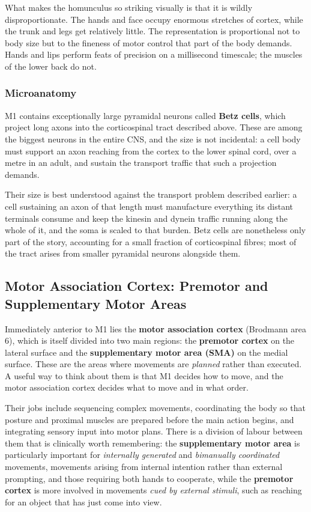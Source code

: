 \documentclass[11pt]{article}
\begin{document}
What makes the homunculus so striking visually is that it is wildly disproportionate. The hands and face occupy enormous stretches of cortex, while the trunk and legs get relatively little. The representation is proportional not to body size but to the fineness of motor control that part of the body demands. Hands and lips perform feats of precision on a millisecond timescale; the muscles of the lower back do not.

\subsubsection{Microanatomy}

M1 contains exceptionally large pyramidal neurons called \textbf{Betz cells}, which project long axons into the corticospinal tract described above. These are among the biggest neurons in the entire CNS, and the size is not incidental: a cell body must support an axon reaching from the cortex to the lower spinal cord, over a metre in an adult, and sustain the transport traffic that such a projection demands.

Their size is best understood against the transport problem described earlier: a cell sustaining an axon of that length must manufacture everything its distant terminals consume and keep the kinesin and dynein traffic running along the whole of it, and the soma is scaled to that burden. Betz cells are nonetheless only part of the story, accounting for a small fraction of corticospinal fibres; most of the tract arises from smaller pyramidal neurons alongside them.

\subsection{Motor Association Cortex: Premotor and Supplementary Motor Areas}

Immediately anterior to M1 lies the \textbf{motor association cortex} (Brodmann area 6), which is itself divided into two main regions: the \textbf{premotor cortex} on the lateral surface and the \textbf{supplementary motor area (SMA)} on the medial surface. These are the areas where movements are \textit{planned} rather than executed. A useful way to think about them is that M1 decides how to move, and the motor association cortex decides what to move and in what order.

Their jobs include sequencing complex movements, coordinating the body so that posture and proximal muscles are prepared before the main action begins, and integrating sensory input into motor plans. There is a division of labour between them that is clinically worth remembering: the \textbf{supplementary motor area} is particularly important for \textit{internally generated} and \textit{bimanually coordinated} movements, movements arising from internal intention rather than external prompting, and those requiring both hands to cooperate, while the \textbf{premotor cortex} is more involved in movements \textit{cued by external stimuli}, such as reaching for an object that has just come into view.
\end{document}
